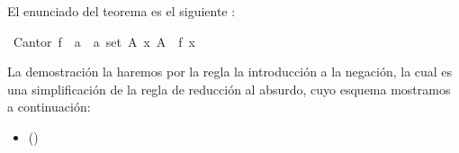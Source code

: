 \begin{isabellebody}
\begin{isamarkuptext}
El enunciado del teorema es el siguiente :%
\end{isamarkuptext}\isamarkuptrue%
\isamarkupfalse%
\ Cantor{\isacharcolon}\ {\isachardoublequoteopen}{\isasymnexists}f\ {\isacharcolon}{\isacharcolon}\ {\isacharprime}a\ {\isasymRightarrow}\ {\isacharprime}a\ set{\isachardot}\ {\isasymforall}A{\isachardot}\ {\isasymexists}x{\isachardot}\ A\ {\isacharequal}\ f\ x{\isachardoublequoteclose}\isanewline
\isanewline
%
\isadelimproof
\isanewline
\ \ %
\endisadelimproof
%
\isatagproof
{}\isamarkupfalse%
%
\endisatagproof
{\isafoldproof}%
%
\isadelimproof
%
\endisadelimproof
%
\begin{isamarkuptext}%
La demostración la haremos por la regla la introducción a la
negación, la cual es una simplificación de la regla de 
reducción al absurdo, cuyo esquema mostramos a continuación:   
 \begin{itemize}
  \item[]  \hfill ()
  \end{itemize}




\end{isamarkuptext}
\end{isabellebody}
